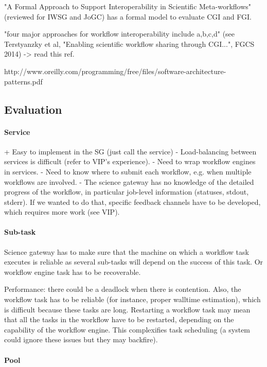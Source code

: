 \documentclass[preprint,3p,twocolumn]{elsarticle}
\begin{document}
"A Formal Approach to Support Interoperability in Scientific
Meta-workflows" (reviewed for IWSG and JoGC) has a formal model to
evaluate CGI and FGI.

"four major approaches for workflow interoperability include a,b,c,d" (see Terstyanzky et al, "Enabling scientific workflow sharing through CGI...", FGCS 2014) -> read this ref.

http://www.oreilly.com/programming/free/files/software-architecture-patterns.pdf

\subsection{Evaluation}

\paragraph{Service}
+ Easy to implement in the SG (just call the service)
- Load-balancing between services is difficult
(refer to VIP's experience).
- Need to wrap workflow engines in
services.
- Need to know where to submit each workflow, e.g. when
multiple workflows are involved.
- The science gateway has no
knowledge of the detailed progress of the workflow, in particular
job-level information (statuses, stdout, stderr). If we wanted to do
that, specific feedback channels have to be developed, which requires more work (see VIP).

\paragraph{Sub-task}

Science gateway has to make sure that the machine on which a workflow
task executes is reliable as several sub-tasks will depend on the
success of this task. Or workflow engine task has to be recoverable.

Performance: there could be a deadlock when there is contention. Also,
the workflow task has to be reliable (for instance, proper walltime
estimation), which is difficult because these tasks are
long. Restarting a workflow task may mean that all the tasks in the
workflow have to be restarted, depending on the capability of the
workflow engine. This complexifies task scheduling (a system could
ignore these issues but they may backfire).


\paragraph{Pool}
\end{document}
